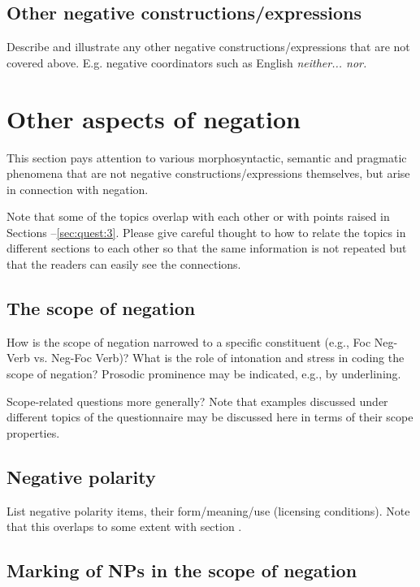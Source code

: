\documentclass[output=paper,colorlinks,citecolor=brown]{langscibook}
\begin{document}
\subsection{Other negative constructions/expressions}\label{sec:quest:3.4}

Describe and illustrate any other negative constructions/expressions that are not covered above. E.g. negative coordinators such as English \textit{neither... nor.}

\section{Other aspects of negation}\label{sec:quest:4}

This section pays attention to various morphosyntactic, semantic and pragmatic phenomena that are not negative constructions/expressions themselves, but arise in connection with negation.

Note that some of the topics overlap with each other or with points raised in Sections --\ref{sec:quest:3}. Please give careful thought to how to relate the topics in different sections to each other so that the same information is not repeated but that the readers can easily see the connections.

\subsection{The scope of negation}\label{sec:quest:4.1}
How is the scope of negation narrowed to a specific constituent (e.g., Foc Neg-Verb vs. Neg-Foc Verb)? What is the role of intonation and stress in coding the scope of negation? Prosodic prominence may be indicated, e.g., by underlining.

Scope-related questions more generally? Note that examples discussed under different topics of the questionnaire may be discussed here in terms of their scope properties.

\subsection{Negative polarity}\label{sec:quest:4.2}

List negative polarity items, their form/meaning/use (licensing conditions). Note that this overlaps to some extent with section .

\subsection{Marking of NPs in the scope of negation}\label{sec:quest:4.3}
\end{document}

